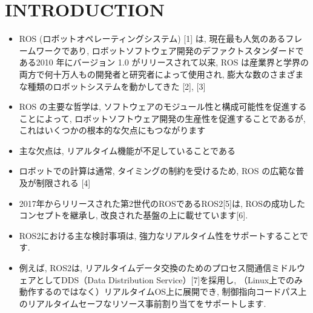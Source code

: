 
\section{INTRODUCTION}
\label{sec: introduction}

\begin{frame}{}
    \begin{itemize}
        \item ROS (ロボットオペレーティングシステム) [1] は, 現在最も人気のあるフレームワークであり, ロボットソフトウェア開発のデファクトスタンダードである2010 年にバージョン 1.0 がリリースされて以来, ROS は産業界と学界の両方で何十万人もの開発者と研究者によって使用され, 膨大な数のさまざまな種類のロボットシステムを動かしてきた [2], [3]
        \item ROS の主要な哲学は, ソフトウェアのモジュール性と構成可能性を促進することによって, ロボットソフトウェア開発の生産性を促進することであるが, これはいくつかの根本的な欠点にもつながります
        \item 主な欠点は, リアルタイム機能が不足していることである
        \item ロボットでの計算は通常, タイミングの制約を受けるため, ROS の広範な普及が制限される [4]
    \end{itemize}
\end{frame}

\begin{frame}{}
    \begin{itemize}
        \item 2017年からリリースされた第2世代のROSであるROS2[5]は, ROSの成功したコンセプトを継承し, 改良された基盤の上に載せています[6].
        \item ROS2における主な検討事項は, 強力なリアルタイム性をサポートすることです.
        \item 例えば, ROS2は, リアルタイムデータ交換のためのプロセス間通信ミドルウェアとしてDDS（Data Distribution Service）[7]を採用し, （Linux上でのみ動作するのではなく）リアルタイムOS上に展開でき, 制御指向コードパス上のリアルタイムセーフなリソース事前割り当てをサポートします.
    \end{itemize}
\end{frame}

